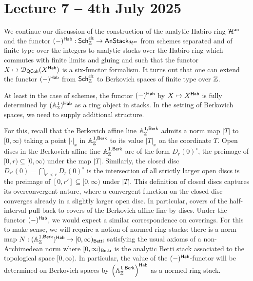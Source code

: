 \section{Lecture 7 -- 4th July 2025}\label{sec: lecture 7}
We continue our discussion of the construction of the analytic Habiro ring $\mathcal{H}^{\mathsf{an}}$ and the functor $(-)^{\mathsf{Hab}}:\mathsf{Sch}_{\mathbb{Z}}^{\mathsf{sft}}\to\mathsf{AnStack}_{\mathcal{H}^{\mathsf{an}}}$ from schemes separated and of finite type over the integers to analytic stacks over the Habiro ring which commutes with finite limits and gluing and such that the functor $X\mapsto\EuScript{D}_{\mathsf{QCoh}}(X^{\mathsf{Hab}})$ is a six-functor formalism. It turns out that one can extend the functor $(-)^{\mathsf{Hab}}$ from $\mathsf{Sch}^{\mathsf{sft}}_{\mathbb{Z}}$ to Berkovich spaces of finite type over $\mathbb{Z}$. 

At least in the case of schemes, the functor $(-)^{\mathsf{Hab}}$ by $X\mapsto X^{\mathsf{Hab}}$ is fully determined by $(\mathbb{A}^{1}_{\mathbb{Z}})^{\mathsf{Hab}}$ as a ring object in stacks. In the setting of Berkovich spaces, we need to supply additional structure. 

For this, recall that the Berkovich affine line $\mathbb{A}^{1,\mathsf{Berk}}_{\mathbb{Z}}$ admits a norm map $|T|$ to $[0,\infty)$ taking a point $|\cdot|_{x}$ in $\mathbb{A}^{1,\mathsf{Berk}}_{\mathbb{Z}}$ to its value $|T|_{x}$ on the coordinate $T$. Open discs in the Berkovich affine line $\mathbb{A}^{1,\mathsf{Berk}}_{\mathbb{Z}}$ are of the form $D_{r}(0)^{\circ}$, the preimage of $[0,r)\subseteq[0,\infty)$ under the map $|T|$. Similarly, the closed disc $D_{r'}(0)=\bigcap_{r'<r}D_{r}(0)^{\circ}$ is the intersection of all strictly larger open discs is the preimage of $[0,r']\subseteq[0,\infty)$ under $|T|$. This definition of closed discs captures its overconvergent nature, where a convergent function on the closed disc converges already in a slightly larger open disc. In particular, covers of the half-interval pull back to covers of the Berkovich affine line by discs. Under the functor $(-)^{\mathsf{Hab}}$, we would expect a similar correspondence on coverings. For this to make sense, we will require a notion of normed ring stacks: there is a norm map $N:(\mathbb{A}^{1,\mathsf{Berk}}_{\mathbb{Z}})^{\mathsf{Hab}}\to[0,\infty)_{\mathsf{Betti}}$ satisfying the usual axioms of a non-Archimedean norm where $[0,\infty)_{\mathsf{Betti}}$ is the analytic Betti stack associated to the topological space $[0,\infty)$. In particular, the value of the $(-)^{\mathsf{Hab}}$-functor will be determined on Berkovich spaces by $\left(\mathbb{A}^{1,\mathsf{Berk}}_{\mathbb{Z}}\right)^{\mathsf{Hab}}$ as a normed ring stack.  

